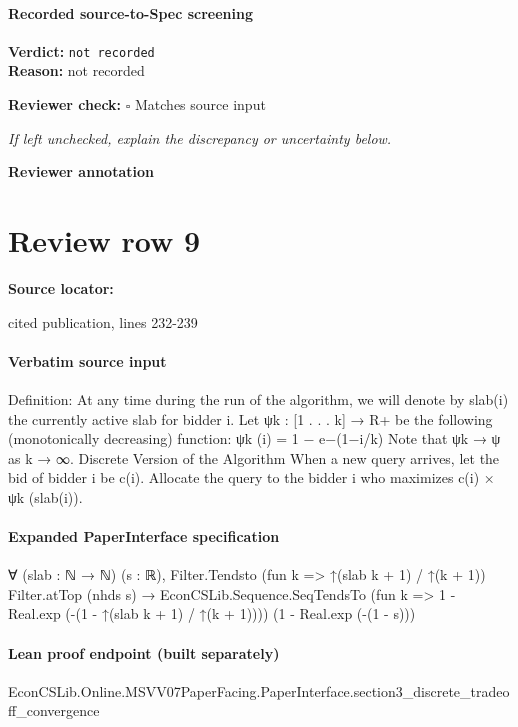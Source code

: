 \documentclass[10pt]{article}
\newcommand{\reviewerbox}{%
  \par\noindent\fbox{\parbox{0.96\linewidth}{\rule{0pt}{0.38in}}}\par
}
\newcommand{\reviewmatch}[1]{%
  \par\noindent\textbf{Reviewer check:} $\square$\; #1\par
  \noindent\emph{If left unchecked, explain the discrepancy or uncertainty below.}\par
}
\begin{document}
\paragraph{Recorded source-to-Spec screening}
\textbf{Verdict:} \texttt{not recorded}
\\
\textbf{Reason:} not recorded
\reviewmatch{Matches source input}
\noindent\textbf{Reviewer annotation}\par
\reviewerbox
\clearpage
\hypertarget{source-claim-df2397a4d99a767a}{}
\section*{Review row 9}
\textbf{Source locator:} {\footnotesize\raggedright cited publication, lines 232-\allowbreak{}239\par}
\paragraph{Verbatim source input}
\begin{ReviewVerbatim}
Definition: At any time during the run of the algorithm, we will denote by slab(i) the
currently active slab for bidder i.
Let ψk : [1 . . . k] → R+ be the following (monotonically decreasing) function:
ψk (i) = 1 − e−(1−i/k)
Note that ψk → ψ as k → ∞.
Discrete Version of the Algorithm
When a new query arrives, let the bid of bidder i be c(i). Allocate the query to the
bidder i who maximizes c(i) × ψk (slab(i)).
\end{ReviewVerbatim}


\paragraph{Expanded PaperInterface specification}
\begin{ReviewVerbatim}
∀ (slab : ℕ → ℕ) (s : ℝ),
  Filter.Tendsto (fun k => ↑(slab k + 1) / ↑(k + 1)) Filter.atTop (nhds s) →
    EconCSLib.Sequence.SeqTendsTo (fun k => 1 - Real.exp (-(1 - ↑(slab k + 1) / ↑(k + 1)))) (1 - Real.exp (-(1 - s)))
\end{ReviewVerbatim}

\paragraph{Lean proof endpoint (built separately)}\begin{ReviewVerbatim}
EconCSLib.Online.MSVV07PaperFacing.PaperInterface.section3_discrete_tradeoff_convergence
\end{ReviewVerbatim}
\end{document}

